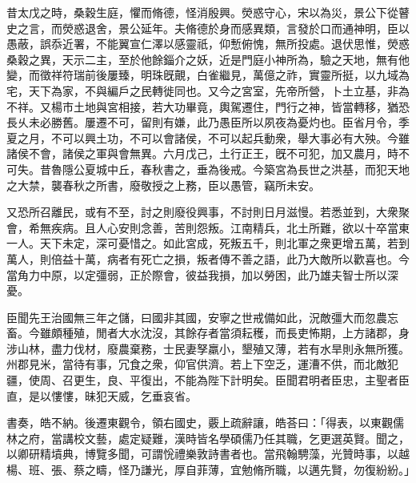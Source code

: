\begin{pinyinscope}
 
 昔太戊之時，桑穀生庭，懼而脩德，怪消殷興。熒惑守心，宋以為災，景公下從瞽史之言，而熒惑退舍，景公延年。夫脩德於身而感異類，言發於口而通神明，臣以愚蔽，誤忝近署，不能翼宣仁澤以感靈祇，仰慙俯愧，無所投處。退伏思惟，熒惑桑穀之異，天示二主，至於他餘錙介之妖，近是門庭小神所為，驗之天地，無有他變，而徵祥符瑞前後屢臻，明珠旣覿，白雀繼見，萬億之祚，實靈所挺，以九域為宅，天下為家，不與編戶之民轉徙同也。又今之宮室，先帝所營，卜土立基，非為不祥。又楊市土地與宮相接，若大功畢竟，輿駕遷住，門行之神，皆當轉移，猶恐長乆未必勝舊。屢遷不可，留則有嫌，此乃愚臣所以夙夜為憂灼也。臣省月令，季夏之月，不可以興土功，不可以會諸侯，不可以起兵動衆，舉大事必有大殃。今雖諸侯不會，諸侯之軍與會無異。六月戊己，土行正王，旣不可犯，加又農月，時不可失。昔魯隱公夏城中丘，春秋書之，垂為後戒。今築宮為長世之洪基，而犯天地之大禁，襲春秋之所書，廢敬授之上務，臣以愚管，竊所未安。
 
 
 
 
 又恐所召離民，或有不至，討之則廢役興事，不討則日月滋慢。若悉並到，大衆聚會，希無疾病。且人心安則念善，苦則怨叛。江南精兵，北土所難，欲以十卒當東一人。天下未定，深可憂惜之。如此宮成，死叛五千，則北軍之衆更增五萬，若到萬人，則倍益十萬，病者有死亡之損，叛者傳不善之語，此乃大敵所以歡喜也。今當角力中原，以定彊弱，正於際會，彼益我損，加以勞困，此乃雄夫智士所以深憂。
 
 
 
 
 臣聞先王治國無三年之儲，曰國非其國，安寧之世戒備如此，況敵彊大而忽農忘畜。今雖頗種殖，閒者大水沈沒，其餘存者當須耘穫，而長吏怖期，上方諸郡，身涉山林，盡力伐材，廢農棄務，士民妻孥羸小，墾殖又薄，若有水旱則永無所獲。州郡見米，當待有事，冗食之衆，仰官供濟。若上下空乏，運漕不供，而北敵犯疆，使周、召更生，良、平復出，不能為陛下計明矣。臣聞君明者臣忠，主聖者臣直，是以慺慺，昧犯天威，乞垂哀省。
 
 
 
 
 書奏，皓不納。後遷東觀令，領右國史，覈上疏辭讓，皓荅曰：「得表，以東觀儒林之府，當講校文藝，處定疑難，漢時皆名學碩儒乃任其職，乞更選英賢。聞之，以卿研精墳典，博覽多聞，可謂恱禮樂敦詩書者也。當飛翰騁藻，光贊時事，以越楊、班、張、蔡之疇，怪乃謙光，厚自菲薄，宜勉脩所職，以邁先賢，勿復紛紛。」
 
 
 

\end{pinyinscope}
